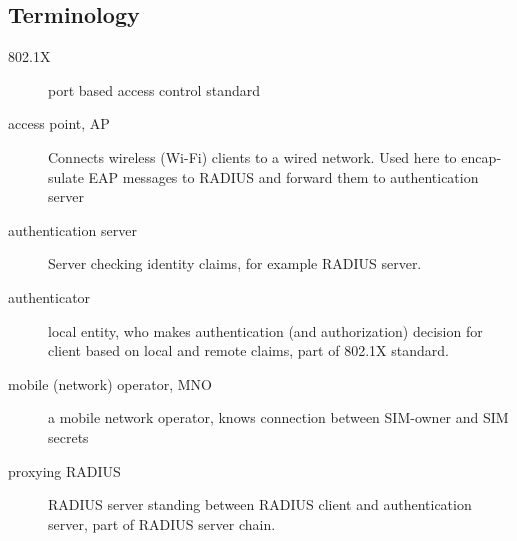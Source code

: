 \documentclass[12pt,a4paper,english]{tutthesis}
\begin{document}
\begin{otherlanguage}{english}
\newpage
\chapter*{Terminology}
\markboth{}{}                                %


\begin{description}
\item[{802.1X}] port based access control standard
\item[{access point, AP}] Connects wireless (Wi-Fi) clients to a wired network.
Used here to encapsulate EAP messages to RADIUS and
forward them to authentication server
\end{description}
\begin{description}
\item[{authentication server}] Server checking identity claims, for
example RADIUS server.
\item[{authenticator}] local entity, who makes authentication (and
authorization) decision for client based on local and remote
claims, part of 802.1X standard.
\end{description}
\begin{description}
\item[{mobile (network) operator, MNO}] a mobile network operator, knows connection
between SIM-owner and SIM secrets
\end{description}
\begin{description}
\item[{proxying RADIUS}] RADIUS server standing between RADIUS
client and authentication server, part of RADIUS server chain.
\end{description}



\if@twoside
\cleardoublepage
\fi

\newpage             %
\setcounter{page}{1} %
\renewcommand{\chaptername}{} %


\end{otherlanguage}
\end{document}
